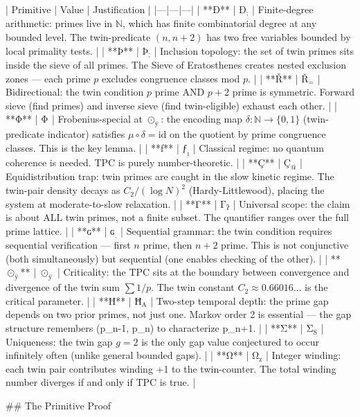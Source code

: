 | Primitive | Value | Justification |
|---|---|---|
| **Ð** | $\mathrm{Ð}_{\mathrm{;}}$ | Finite-degree arithmetic: primes live in $\mathbb{N}$, which has finite combinatorial degree at any bounded level. The twin-predicate $(n, n+2)$ has two free variables bounded by local primality tests. |
| **Þ** | $\mathrm{Þ}_{\mathrm{;}}$ | Inclusion topology: the set of twin primes sits inside the sieve of all primes. The Sieve of Eratosthenes creates nested exclusion zones — each prime $p$ excludes congruence classes mod $p$. |
| **Ř** | $\mathrm{Ř}_{\mathrm{=}}$ | Bidirectional: the twin condition $p$ prime AND $p+2$ prime is symmetric. Forward sieve (find primes) and inverse sieve (find twin-eligible) exhaust each other. |
| **Φ** | $\mathrm{Φ}_{\mathrm{}}$ | Frobenius-special at $⊙_{ÿ}$: the encoding map $\delta: \mathbb{N} \to \{0,1\}$ (twin-predicate indicator) satisfies $\mu \circ \delta = \mathrm{id}$ on the quotient by prime congruence classes. This is the key lemma. |
| **ƒ** | $\mathrm{ƒ}_{\mathrm{ı}}$ | Classical regime: no quantum coherence is needed. TPC is purely number-theoretic. |
| **Ç** | $\mathrm{Ç}_{\mathrm{@}}$ | Equidistribution trap: twin primes are caught in the slow kinetic regime. The twin-pair density decays as $C_2/(\log N)^2$ (Hardy-Littlewood), placing the system at moderate-to-slow relaxation. |
| **Γ** | $\mathrm{Γ}_{\mathrm{ʔ}}$ | Universal scope: the claim is about ALL twin primes, not a finite subset. The quantifier ranges over the full prime lattice. |
| **ɢ** | $\mathrm{ɢ}_{\mathrm{ˌ}}$ | Sequential grammar: the twin condition requires sequential verification — first $n$ prime, then $n+2$ prime. This is not conjunctive (both simultaneously) but sequential (one enables checking of the other). |
| **$⊙_{ÿ}$** | $⊙_{ÿ}$ | Criticality: the TPC sits at the boundary between convergence and divergence of the twin sum $\sum 1/p$. The twin constant $C_2 \approx 0.66016...$ is the critical parameter. |
| **Ħ** | $\mathrm{Ħ}_{\mathrm{A}}$ | Two-step temporal depth: the prime gap depends on two prior primes, not just one. Markov order 2 is essential — the gap structure remembers (p_{n-1}, p_n) to characterize p_{n+1}. |
| **Σ** | $\mathrm{Σ}_{\mathrm{S}}$ | Uniqueness: the twin gap $g=2$ is the only gap value conjectured to occur infinitely often (unlike general bounded gaps). |
| **Ω** | $\mathrm{Ω}_{\mathrm{z}}$ | Integer winding: each twin pair contributes winding +1 to the twin-counter. The total winding number diverges if and only if TPC is true. |

## The Primitive Proof

